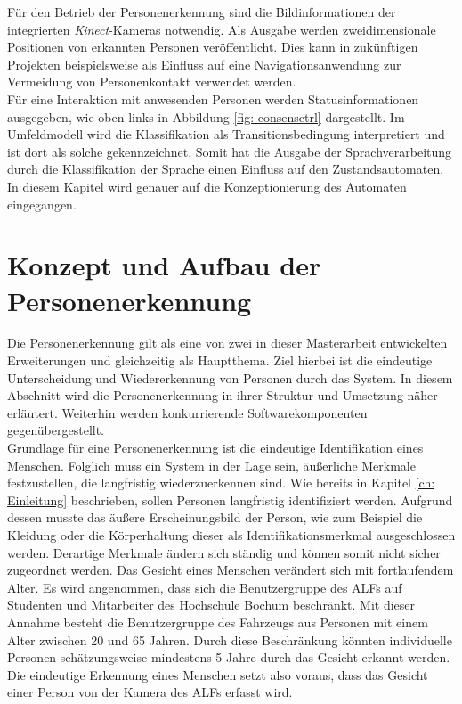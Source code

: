 	Für den Betrieb der Personenerkennung sind die Bildinformationen der integrierten \textit{Kinect}-Kameras notwendig. Als Ausgabe werden zweidimensionale Positionen von erkannten Personen veröffentlicht. Dies kann in zukünftigen Projekten beispielsweise als Einfluss auf eine Navigationsanwendung zur Vermeidung von Personenkontakt verwendet werden.\\
	
	
	
	Für eine Interaktion mit anwesenden Personen werden Statusinformationen ausgegeben, wie oben links in Abbildung \ref{fig: consensctrl} dargestellt. Im Umfeldmodell wird die Klassifikation als Transitionsbedingung interpretiert und ist dort als solche gekennzeichnet. Somit hat die Ausgabe der Sprachverarbeitung durch die Klassifikation der Sprache einen Einfluss auf den Zustandsautomaten. In diesem Kapitel wird genauer auf die Konzeptionierung des Automaten eingegangen.\\
		

	
	
	
	\section{Konzept und Aufbau der Personenerkennung}
	\label{sec: Konzept Personenerkennung}
	
	Die Personenerkennung gilt als eine von zwei in dieser Masterarbeit entwickelten Erweiterungen und gleichzeitig als Hauptthema. Ziel hierbei ist die eindeutige Unterscheidung und Wiedererkennung von Personen durch das System. In diesem Abschnitt wird die Personenerkennung in ihrer Struktur und Umsetzung näher erläutert. Weiterhin werden konkurrierende Softwarekomponenten gegenübergestellt.\\
	
	Grundlage für eine Personenerkennung ist die eindeutige Identifikation eines Menschen. Folglich muss ein System in der Lage sein, äußerliche Merkmale festzustellen, die langfristig wiederzuerkennen sind. Wie bereits in Kapitel \ref{ch: Einleitung} beschrieben, sollen Personen langfristig identifiziert werden. Aufgrund dessen musste das äußere Erscheinungsbild der Person, wie zum Beispiel die Kleidung oder die Körperhaltung dieser als Identifikationsmerkmal ausgeschlossen werden. Derartige Merkmale ändern sich ständig und können somit nicht sicher zugeordnet werden. Das Gesicht eines Menschen verändert sich mit fortlaufendem Alter. Es wird angenommen, dass sich die Benutzergruppe des ALFs auf Studenten und Mitarbeiter des Hochschule Bochum beschränkt. Mit dieser Annahme besteht die Benutzergruppe des Fahrzeugs aus Personen mit einem Alter zwischen 20 und 65 Jahren. Durch diese Beschränkung könnten individuelle Personen schätzungsweise mindestens 5 Jahre durch das Gesicht erkannt werden. Die eindeutige Erkennung eines Menschen setzt also voraus, dass das Gesicht einer Person von der Kamera des ALFs erfasst wird. \\ 
	
